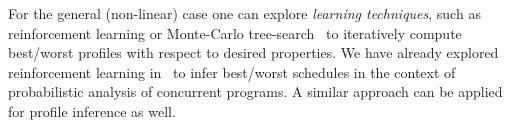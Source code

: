 For the general (non-linear) case one can explore {\em learning
  techniques}, such as reinforcement learning or Monte-Carlo
tree-search~\cite{sutton1998reinforcement} to iteratively compute
best/worst profiles with respect to desired properties. We have
already explored reinforcement learning in~\cite{luckow2014probabilistic} to
infer best/worst schedules in the context of probabilistic analysis of
concurrent programs. A similar approach can be applied for profile
inference as well. 


